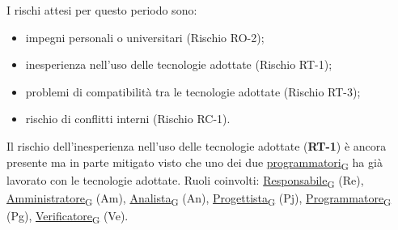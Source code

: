I rischi attesi per questo periodo sono:
\begin{itemize}
	\item impegni personali o universitari (Rischio RO-2);
	\item inesperienza nell'uso delle tecnologie adottate (Rischio RT-1);
	\item problemi di compatibilità tra le tecnologie adottate (Rischio RT-3);
	\item rischio di conflitti interni (Rischio RC-1).
\end{itemize}
Il rischio dell'inesperienza nell'uso delle tecnologie adottate (\textbf{RT-1}) è ancora presente ma in parte mitigato visto che uno dei
due \href{https://7last.github.io/docs/rtb/documentazione-interna/glossario\#programmatore}{programmatori\textsubscript{G}} ha già lavorato con le tecnologie adottate.
\newpage
{}
Ruoli coinvolti: \href{https://7last.github.io/docs/rtb/documentazione-interna/glossario\#responsabile}{Responsabile\textsubscript{G}} (Re), \href{https://7last.github.io/docs/rtb/documentazione-interna/glossario\#amministratore}{Amministratore\textsubscript{G}} (Am), \href{https://7last.github.io/docs/rtb/documentazione-interna/glossario\#analista}{Analista\textsubscript{G}} (An), \href{https://7last.github.io/docs/rtb/documentazione-interna/glossario\#progettista}{Progettista\textsubscript{G}} (Pj), \href{https://7last.github.io/docs/rtb/documentazione-interna/glossario\#programmatore}{Programmatore\textsubscript{G}} (Pg), \href{https://7last.github.io/docs/rtb/documentazione-interna/glossario\#verificatore}{Verificatore\textsubscript{G}} (Ve).
